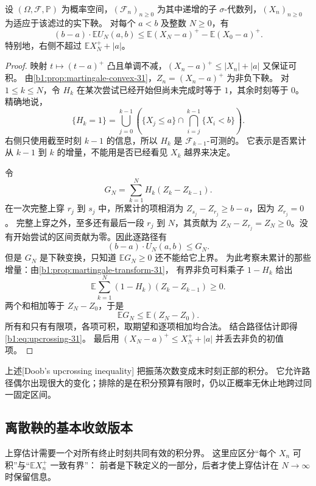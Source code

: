 \begin{theorem}
\label{b1:thm:upcrossing-31}
设 \((\Omega,\mathcal F,\mathbb P)\) 为概率空间，\((\mathcal F_n)_{n\geq0}\)
为其中递增的子 \(\sigma\)-代数列，\((X_n)_{n\geq0}\) 为适应于该滤过的实下鞅。
对每个 \(a<b\) 及整数 \(N\geq0\)，有
\begin{equation}
 (b-a)\cdot\mathbb E U_N(a,b)
 \leq\mathbb E(X_N-a)^+-\mathbb E(X_0-a)^+.
 \label{b1:eq:upcrossing-31}
\end{equation}
特别地，右侧不超过 \(\mathbb E X_N^++|a|\)。
\end{theorem}
\begin{proof}
映射 \(t\mapsto(t-a)^+\) 凸且单调不减，\((X_n-a)^+\leq|X_n|+|a|\) 又保证可积。
由\cref{b1:prop:martingale-convex-31}，\(Z_n=(X_n-a)^+\) 为非负下鞅。
对 \(1\leq k\leq N\)，令 \(H_k\) 在某次尝试已经开始但尚未完成时等于 \(1\)，其余时刻等于 \(0\)。
精确地说，
\[
 \{H_k=1\}
 =\bigcup_{j=0}^{k-1}
   \left(\{X_j\leq a\}\cap\bigcap_{i=j}^{k-1}\{X_i<b\}\right).
\]
右侧只使用截至时刻 \(k-1\) 的信息，所以 \(H_k\) 是 \(\mathcal F_{k-1}\)-可测的。
它表示是否累计从 \(k-1\) 到 \(k\) 的增量，不能用是否已经看见 \(X_k\) 越界来决定。

令
\[
 G_N=\sum_{k=1}^N H_k(Z_k-Z_{k-1}).
\]
在一次完整上穿 \(r_j\) 到 \(s_j\) 中，所累计的项相消为
\(Z_{s_j}-Z_{r_j}\geq b-a\)，因为 \(Z_{r_j}=0\)。
完整上穿之外，至多还有最后一段 \(r_j\) 到 \(N\)，其贡献为
\(Z_N-Z_{r_j}=Z_N\geq0\)。没有开始尝试的区间贡献为零。因此逐路径有
\[
 (b-a)\cdot U_N(a,b)\leq G_N.
\]
但是 \(G_N\) 是下鞅变换，只知道 \(\mathbb E G_N\geq0\) 还不能给它上界。
为此考察未累计的那些增量：由\cref{b1:prop:martingale-transform-31}，
有界非负可料乘子 \(1-H_k\) 给出
\[
 \mathbb E\sum_{k=1}^N(1-H_k)(Z_k-Z_{k-1})\geq0.
\]
两个和相加等于 \(Z_N-Z_0\)，于是
\[
 \mathbb E G_N\leq\mathbb E(Z_N-Z_0).
\]
所有和只有有限项，各项可积，取期望和逐项相加均合法。
结合路径估计即得\eqref{b1:eq:upcrossing-31}。
最后用 \((X_N-a)^+\leq X_N^++|a|\) 并丢去非负的初值项。
\end{proof}

上述[Doob's upcrossing inequality]
把振荡次数变成末时刻正部的积分。
它允许路径偶尔出现很大的变化；排除的是在积分预算有限时，仍以正概率无休止地跨过同一固定区间。

\subsection{离散鞅的基本收敛版本}
\label{b1:subsec:310503}

上穿估计需要一个对所有终止时刻共同有效的积分界。
这里应区分“每个 \(X_n\) 可积”与“\(\mathbb E X_n^+\) 一致有界”：
前者是下鞅定义的一部分，后者才使上穿估计在 \(N\to\infty\) 时保留信息。

